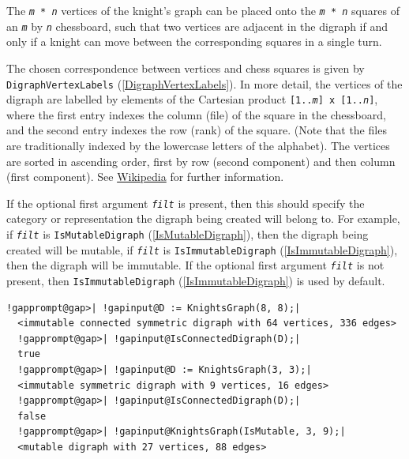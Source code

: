 \documentclass[a4paper,11pt]{report}
\begin{document}
{{{ The \texttt{\mbox{\texttt{\mdseries\slshape m}} * \mbox{\texttt{\mdseries\slshape n}}} vertices of the knight's graph can be placed onto the \texttt{\mbox{\texttt{\mdseries\slshape m}} * \mbox{\texttt{\mdseries\slshape n}}} squares of an \mbox{\texttt{\mdseries\slshape m}} by \mbox{\texttt{\mdseries\slshape n}} chessboard, such that two vertices are adjacent in the digraph if and only if
a knight can move between the corresponding squares in a single turn. 

 The chosen correspondence between vertices and chess squares is given by \texttt{DigraphVertexLabels} (\ref{DigraphVertexLabels}). In more detail, the vertices of the digraph are labelled by elements of the
Cartesian product \texttt{[1..\mbox{\texttt{\mdseries\slshape m}}] x [1..\mbox{\texttt{\mdseries\slshape n}}]}, where the first entry indexes the column (file) of the square in the
chessboard, and the second entry indexes the row (rank) of the square. (Note
that the files are traditionally indexed by the lowercase letters of the
alphabet). The vertices are sorted in ascending order, first by row (second
component) and then column (first component). See \href{https://en.wikipedia.org/wiki/Knight's_graph} {Wikipedia} for further information. 

 If the optional first argument \mbox{\texttt{\mdseries\slshape filt}} is present, then this should specify the category or representation the
digraph being created will belong to. For example, if \mbox{\texttt{\mdseries\slshape filt}} is \texttt{IsMutableDigraph} (\ref{IsMutableDigraph}), then the digraph being created will be mutable, if \mbox{\texttt{\mdseries\slshape filt}} is \texttt{IsImmutableDigraph} (\ref{IsImmutableDigraph}), then the digraph will be immutable. If the optional first argument \mbox{\texttt{\mdseries\slshape filt}} is not present, then \texttt{IsImmutableDigraph} (\ref{IsImmutableDigraph}) is used by default.

 
\begin{Verbatim}[commandchars=!@|,fontsize=\small,frame=single,label=Example]
  !gapprompt@gap>| !gapinput@D := KnightsGraph(8, 8);|
  <immutable connected symmetric digraph with 64 vertices, 336 edges>
  !gapprompt@gap>| !gapinput@IsConnectedDigraph(D);|
  true
  !gapprompt@gap>| !gapinput@D := KnightsGraph(3, 3);|
  <immutable symmetric digraph with 9 vertices, 16 edges>
  !gapprompt@gap>| !gapinput@IsConnectedDigraph(D);|
  false
  !gapprompt@gap>| !gapinput@KnightsGraph(IsMutable, 3, 9);|
  <mutable digraph with 27 vertices, 88 edges>
\end{Verbatim}
 }

}}
\end{document}
